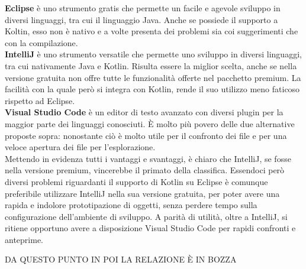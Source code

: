 \documentclass[12pt,a4paper,openright,oneside]{report}
\begin{document}
\textbf{Eclipse} è uno strumento gratis che permette un facile e agevole sviluppo in diversi linguaggi, tra cui il linguaggio Java. Anche se possiede il supporto a Koltin, esso non è nativo e a volte presenta dei problemi sia coi suggerimenti che con la compilazione.\\

\textbf{IntelliJ} è uno strumento versatile che permette uno sviluppo in diversi linguaggi, tra cui nativamente Java e Kotlin. Risulta essere la miglior scelta, anche se nella versione gratuita non offre tutte le funzionalità offerte nel pacchetto premium. La facilità con la quale però si integra con Kotlin, rende il suo utilizzo meno faticoso rispetto ad Eclipse.\\

\textbf{Visual Studio Code} è un editor di testo avanzato con diversi plugin per la maggior parte dei linguaggi conosciuti. È molto più povero delle due alternative proposte sopra: nonostante ciò è molto utile per il confronto dei file e per una veloce apertura dei file per l'esplorazione.\\

Mettendo in evidenza tutti i vantaggi e svantaggi, è chiaro che IntelliJ, se fosse nella versione premium, vincerebbe il primato della classifica. Essendoci però diversi problemi riguardanti il supporto di Kotlin su Eclipse è comunque preferibile utilizzare IntelliJ nella sua versione gratuita, per poter avere una rapida e indolore prototipazione di oggetti, senza perdere tempo sulla configurazione dell'ambiente di sviluppo. A parità di utilità, oltre a IntelliJ, si ritiene opportuno avere a disposizione Visual Studio Code per rapidi confronti e anteprime.\\





\begin{titlepage}
	\begin{center}
		\Large{DA QUESTO PUNTO IN POI LA RELAZIONE È IN BOZZA}
	\end{center}
\end{titlepage}
\end{document}
